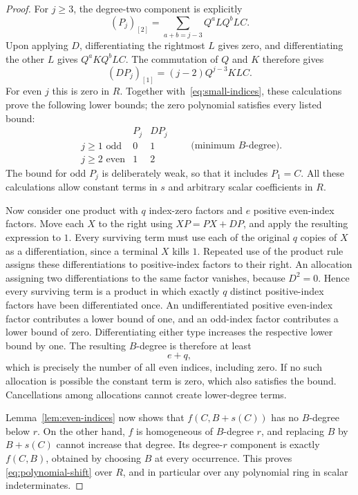 \begin{proof}
For $j\geq3$, the degree-two component is explicitly
\[
 (P_j)_{[2]}=
 \sum_{a+b=j-3}Q^aLQ^bLC.
\]
Upon applying $D$, differentiating the rightmost $L$ gives zero,
and differentiating the other $L$ gives $Q^aKQ^bLC$.
The commutation of $Q$ and $K$ therefore gives
\begin{equation}
 \label{eq:differentiated-linear-part}
 (DP_j)_{[1]}=(j-2)Q^{j-3}KLC.
\end{equation}
For even $j$ this is zero in $R$.
Together with~\eqref{eq:small-indices}, these calculations prove
the following lower bounds; the zero polynomial satisfies every
listed bound:
\[
\begin{array}{c|cc}
 & P_j & DP_j\\ \hline
 j\geq1\text{ odd} & 0 & 1\\
 j\geq2\text{ even} & 1 & 2
\end{array}
\qquad\text{(minimum $B$-degree).}
\]
The bound for odd $P_j$ is deliberately weak, so that it includes
$P_1=C$.
All these calculations allow constant terms in $s$ and arbitrary
scalar coefficients in $R$.

Now consider one product with $q$ index-zero factors and $e$ positive
even-index factors.  Move each $X$ to the right using
$XP=PX+DP$, and apply the resulting expression to $1$.
Every surviving term must use each of the original $q$ copies of
$X$ as a differentiation, since a terminal $X$ kills $1$.
Repeated use of the product rule assigns these differentiations
to positive-index factors to their right.  An allocation assigning
two differentiations to the same factor vanishes, because $D^2=0$.
Hence every surviving term is a product in which exactly $q$
distinct positive-index factors have been differentiated once.
An undifferentiated positive even-index factor contributes a lower
bound of one, and an odd-index factor contributes a lower bound
of zero.  Differentiating either type increases the respective
lower bound by one.  The resulting $B$-degree is therefore at least
\[
 e+q,
\]
which is precisely the number of all even indices, including zero.
If no such allocation is possible the constant term is zero, which
also satisfies the bound.  Cancellations among allocations cannot
create lower-degree terms.

Lemma~\ref{lem:even-indices} now shows that $f(C,B+s(C))$ has no
$B$-degree below $r$.  On the other hand, $f$ is homogeneous of
$B$-degree $r$, and replacing $B$ by $B+s(C)$ cannot increase that
degree.  Its degree-$r$ component is exactly $f(C,B)$, obtained by
choosing $B$ at every occurrence.  This proves
\eqref{eq:polynomial-shift} over $R$, and in particular over any
polynomial ring in scalar indeterminates.
\end{proof}

